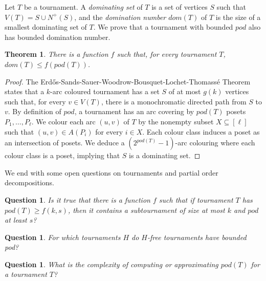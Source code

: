 \documentclass{article}
\newtheorem{question}[lemma]{Question}
\newtheorem{theorem}[lemma]{Theorem}
\begin{document}
Let $T$ be a tournament. A \emph{dominating set} of $T$ is a set of vertices $S$ such that $V(T) = S \cup N^+(S)$, and the \emph{domination number $dom(T)$} of $T$ is the size of a smallest dominating set of $T$. We prove that a tournament with bounded $pod$ also has bounded domination number. 

\begin{theorem}
     There is a function $f$ such that, for every tournament $T$,  $dom(T) \leq f(pod(T))$.
\end{theorem}

\begin{proof}
    The Erd\H{o}s-Sands-Sauer-Woodrow-Bousquet-Lochet-Thomassé Theorem~\cite{Erdos_Sauer_Woodrow} states that a $k$-arc coloured tournament has a set $S$ of at most $g(k)$ vertices such that, for every  $v \in V(T)$, there is a monochromatic directed path from $S$ to $v$. By definition of $pod$, a tournament has an arc covering by $pod(T)$ posets $P_1,\dots,P_\ell$. We colour each arc $(u,v)$ of $T$ by the nonempty subset $X \subseteq [\ell]$ such that $(u,v) \in A(P_i)$ for every $i \in X$. Each colour class induces a poset as an intersection of posets.
    We deduce a $(2^{pod(T)}-1)$-arc colouring where each colour class is a poset, implying that $S$ is a dominating set.
\end{proof}


We end with some open questions on tournaments and partial order decompositions.

\begin{question}
Is it true that there is a function $f$ such that if tournament $T$ has  $pod(T) \geq f(k,s)$, then it contains a subtournament of size at most $k$ and $pod$ at least $s$? 
\end{question}

\begin{question}
For which tournaments $H$ do $H$-free tournaments have bounded pod?
\end{question}

\begin{question}
    What is the complexity of computing or approximating $pod(T)$ for a tournament $T$?
\end{question}



\end{document}
